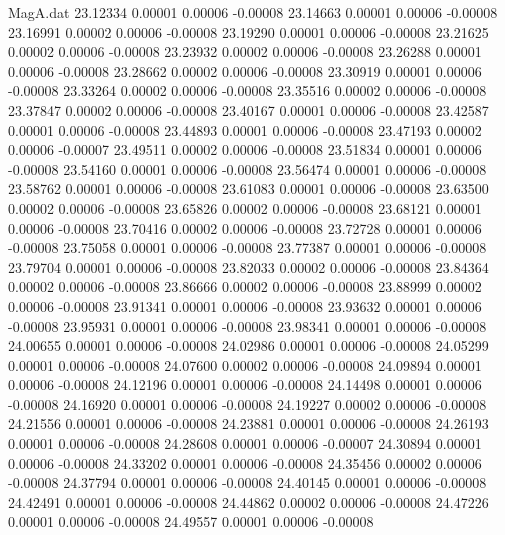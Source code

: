 \begin{filecontents}{MagA.dat}
  23.12334    0.00001    0.00006   -0.00008
  23.14663    0.00001    0.00006   -0.00008
  23.16991    0.00002    0.00006   -0.00008
  23.19290    0.00001    0.00006   -0.00008
  23.21625    0.00002    0.00006   -0.00008
  23.23932    0.00002    0.00006   -0.00008
  23.26288    0.00001    0.00006   -0.00008
  23.28662    0.00002    0.00006   -0.00008
  23.30919    0.00001    0.00006   -0.00008
  23.33264    0.00002    0.00006   -0.00008
  23.35516    0.00002    0.00006   -0.00008
  23.37847    0.00002    0.00006   -0.00008
  23.40167    0.00001    0.00006   -0.00008
  23.42587    0.00001    0.00006   -0.00008
  23.44893    0.00001    0.00006   -0.00008
  23.47193    0.00002    0.00006   -0.00007
  23.49511    0.00002    0.00006   -0.00008
  23.51834    0.00001    0.00006   -0.00008
  23.54160    0.00001    0.00006   -0.00008
  23.56474    0.00001    0.00006   -0.00008
  23.58762    0.00001    0.00006   -0.00008
  23.61083    0.00001    0.00006   -0.00008
  23.63500    0.00002    0.00006   -0.00008
  23.65826    0.00002    0.00006   -0.00008
  23.68121    0.00001    0.00006   -0.00008
  23.70416    0.00002    0.00006   -0.00008
  23.72728    0.00001    0.00006   -0.00008
  23.75058    0.00001    0.00006   -0.00008
  23.77387    0.00001    0.00006   -0.00008
  23.79704    0.00001    0.00006   -0.00008
  23.82033    0.00002    0.00006   -0.00008
  23.84364    0.00002    0.00006   -0.00008
  23.86666    0.00002    0.00006   -0.00008
  23.88999    0.00002    0.00006   -0.00008
  23.91341    0.00001    0.00006   -0.00008
  23.93632    0.00001    0.00006   -0.00008
  23.95931    0.00001    0.00006   -0.00008
  23.98341    0.00001    0.00006   -0.00008
  24.00655    0.00001    0.00006   -0.00008
  24.02986    0.00001    0.00006   -0.00008
  24.05299    0.00001    0.00006   -0.00008
  24.07600    0.00002    0.00006   -0.00008
  24.09894    0.00001    0.00006   -0.00008
  24.12196    0.00001    0.00006   -0.00008
  24.14498    0.00001    0.00006   -0.00008
  24.16920    0.00001    0.00006   -0.00008
  24.19227    0.00002    0.00006   -0.00008
  24.21556    0.00001    0.00006   -0.00008
  24.23881    0.00001    0.00006   -0.00008
  24.26193    0.00001    0.00006   -0.00008
  24.28608    0.00001    0.00006   -0.00007
  24.30894    0.00001    0.00006   -0.00008
  24.33202    0.00001    0.00006   -0.00008
  24.35456    0.00002    0.00006   -0.00008
  24.37794    0.00001    0.00006   -0.00008
  24.40145    0.00001    0.00006   -0.00008
  24.42491    0.00001    0.00006   -0.00008
  24.44862    0.00002    0.00006   -0.00008
  24.47226    0.00001    0.00006   -0.00008
  24.49557    0.00001    0.00006   -0.00008

\end{filecontents}
